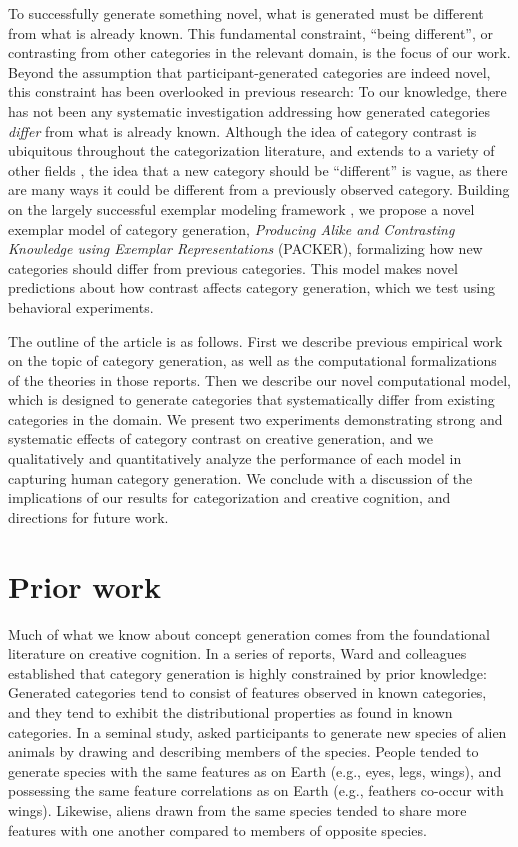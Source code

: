 \documentclass[12pt]{article}
\begin{document}
\begin{flushleft}
To successfully generate something novel, what is generated must be different from what is already known. This fundamental constraint, ``being different'', or contrasting from other categories in the relevant domain, is the focus of our work. Beyond the assumption that participant-generated categories are indeed novel, this constraint has been overlooked in previous research: To our knowledge, there has not been any systematic investigation addressing how generated categories {\em differ} from what is already known. Although the idea of category contrast is ubiquitous throughout the categorization literature, and extends to a variety of other fields \citep[e.g., color;][]{regier2007}, the idea that a new category should be ``different'' is vague, as there are many ways it could be different from a previously observed category. Building on the largely successful exemplar modeling framework \citep{medin1978context,nosofsky1984choice,nosofsky1986attention}, we propose a novel exemplar model of category generation, {\em Producing Alike and Contrasting Knowledge using Exemplar Representations} (PACKER), formalizing how new categories should differ from previous categories. This model makes novel predictions about how contrast affects category generation, which we test using behavioral experiments.

The outline of the article is as follows. First we describe previous empirical work on the topic of category generation, as well as the computational formalizations of the theories in those reports. Then we describe our novel computational model, which is designed to generate categories that systematically differ from existing categories in the domain. We present two experiments demonstrating strong and systematic effects of category contrast on creative generation, and we qualitatively and quantitatively analyze the performance of each model in capturing human category generation. We conclude with a discussion of the implications of our results for categorization and creative cognition, and directions for future work.

\section{Prior work}

Much of what we know about concept generation comes from the foundational literature on creative cognition. In a series of reports, Ward and colleagues \citep{ward1995s,ward1994structured,marsh1999inadvertent,ward2002role,smith1993constraining} established that category generation is highly constrained by prior knowledge: Generated categories tend to consist of features observed in known categories, and they tend to exhibit the distributional properties as found in known categories. In a seminal study, \cite{ward1994structured} asked participants to generate new species of alien animals by drawing and describing members of the species. People tended to generate species with the same features as on Earth (e.g., eyes, legs, wings), and possessing the same feature correlations as on Earth (e.g., feathers co-occur with wings). Likewise, aliens drawn from the same species tended to share more features with one another compared to members of opposite species. 


\end{flushleft}
\end{document}
